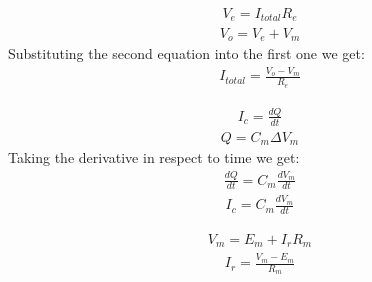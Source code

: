 \documentclass[11pt]{article}
\begin{document}
\begin{enumerate}[label=\arabic*.]
\begin{enumerate}[label=(\alph*)]
\begin{align*}
V_e = I_{total} R_e
\end{align*}
\begin{align*}
V_o = V_e + V_m
\end{align*}
Substituting the second equation into the first one we get:
\begin{align*}
I_{total} = \frac{V_o - V_m} {R_e}
\end{align*}

\begin{align*}
I_c = \frac{dQ} {dt}
\end{align*}
\begin{align*}
Q = C_m\Delta V_m
\end{align*}
Taking the derivative in respect to time we get:
\begin{align*}
\frac{dQ} {dt} = C_m \frac{dV_m} {dt}
\end{align*}
\begin{align*}
I_c = C_m \frac{dV_m} {dt}
\end{align*}

\begin{align*}
V_m = E_m + I_r R_m
\end{align*}
\begin{align*}
I_r = \frac{V_m - E_m} {R_m}
\end{align*}


\end{enumerate}
\end{enumerate}
\end{document}
